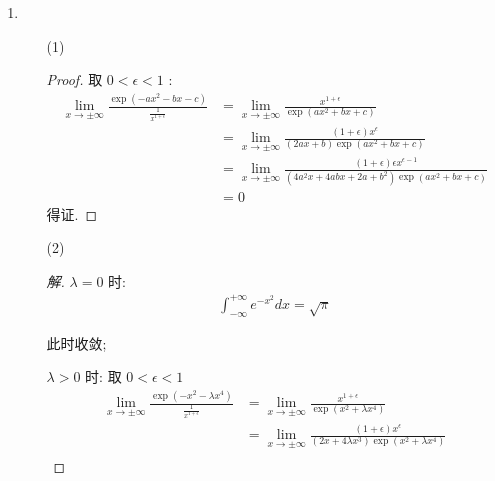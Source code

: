 \documentclass{article}
\begin{document}
\begin{enumerate}
\begin{enumerate}
\begin{proof}[证明]
\begin{equation}
                \nonumber
            \end{equation} \par
            得证.
        \end{proof}
    \end{enumerate}
    \item \begin{enumerate}
        \item[(1)] \begin{proof}
            取 $0<\epsilon<1$ : 
            \begin{equation}
                \begin{aligned}
                    \lim_{x\rightarrow\pm\infty}\frac{\exp(-ax^2-bx-c)}{\frac{1}{x^{1+\epsilon}}}
                    &=\lim_{x\rightarrow\pm\infty}\frac{x^{1+\epsilon}}{\exp(ax^2+bx+c)} \\
                    &=\lim_{x\rightarrow\pm\infty}\frac{(1+\epsilon)x^{\epsilon}}{(2ax+b)\exp(ax^2+bx+c)} \\
                    &=\lim_{x\rightarrow\pm\infty}\frac{(1+\epsilon)\epsilon x^{\epsilon-1}}{(4a^2x+4abx+2a+b^2)\exp(ax^2+bx+c)} \\
                    &=0
                \end{aligned}
                \nonumber
            \end{equation}
            得证.
        \end{proof}
        \item[(2)] \begin{proof}[解]
            $\lambda=0$ 时: 
            \begin{equation}
                \begin{aligned}
                    \int_{-\infty}^{+\infty}e^{-x^2}dx=\sqrt{\pi}
                \end{aligned}
                \nonumber
            \end{equation} \par
            此时收敛; \par
            $\lambda>0$ 时: 取 $0<\epsilon<1$
            \begin{equation}
                \begin{aligned}
                    \lim_{x\rightarrow\pm\infty}\frac{\exp(-x^2-\lambda x^4)}{\frac{1}{x^{1+\epsilon}}}
                    &=\lim_{x\rightarrow\pm\infty}\frac{x^{1+\epsilon}}{\exp(x^2+\lambda x^4)} \\
                    &=\lim_{x\rightarrow\pm\infty}\frac{(1+\epsilon)x^{\epsilon}}{(2x+4\lambda x^3)\exp(x^2+\lambda x^4)} \\

\end{aligned}
\end{equation}
\end{proof}
\end{enumerate}
\end{enumerate}
\end{document}
